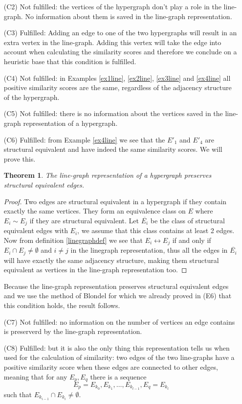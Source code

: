 \documentclass[a4paper,11pt]{report}
\newtheorem{theorem}{Theorem}[section]
\begin{document}
\begin{itemize}
 
   \item[(C2)] Not fulfilled: the vertices of the hypergraph don't play a role 
   in the line-graph. No information about them is saved in the line-graph 
   representation.
  \item[(C3)] Fulfilled: Adding an edge to one of the two hypergraphs will 
  result in an extra vertex in the line-graph. Adding this vertex will take the 
  edge into account when calculating the similarity scores and therefore we 
  conclude on a heuristic base that this condition is fulfilled.
  \item[(C4)] Not fulfilled: in Examples \ref{ex1line}, \ref{ex2line}, \ref{ex3line}  
  and \ref{ex4line}
  all positive similarity scores are the same, regardless of the adjacency 
  structure of the hypergraph.
  \item[(C5)] Not fulfilled: there is no information about the vertices saved in 
  the line-graph representation of a hypergraph.
  \item[(C6)] Fulfilled: from Example \ref{ex4line} we see that the $E'_1$ and 
 $E'_4$ are structural equivalent and have indeed the same similarity scores. We will 
 prove this.
 
 \begin{theorem}
   The line-graph representation of a hypergraph preserves structural equivalent 
   edges.
 \end{theorem}
 \begin{proof}
   Two edges are structural equivalent in a hypergraph if they contain exactly the same 
   vertices. They form an equivalence class on $E$ where $E_i \sim E_j$ if they 
   are structural equivalent. Let $\overline{E_i}$ be the class of structural equivalent 
   edges with $E_i$, we assume that this class contains at least 2 edges. Now from definition \ref{linegraphdef} we see that
   $E_i \leftrightarrow E_j$ if and only if $E_i \cap E_j \not = \emptyset$ and $i \not = j$ 
   in the linegraph representation, thus all the edges in $\overline{E_i}$ will 
   have exactly the same adjacency structure, making them structural equivalent as vertices in the 
   line-graph representation too.
 \end{proof}
 Because the line-graph representation preserves structural equivalent edges and we use the method of Blondel for which we already proved
 in (E6) that this condition holds, the result follows.
     \item[(C7)] Not fulfilled: no information on the number of vertices an edge 
contains is preserverd by the line-graph representation.
  \item[(C8)] Fulfilled: but it is also the only thing this representation tells us 
  when used for the calculation of similarity: two edges of the two line-graphs
  have a positive similarity score when these edges are connected to other edges, meaning that for any $E_p, E_q$ there is a sequence 
  $$E_p = E_{k_0}, E_{k_1}, \ldots, E_{k_{l-1}}, E_q = E_{k_l}$$
  such that $E_{k_{i-1}} \cap E_{k_i} \not = \emptyset$. 
  

\end{itemize}
\end{document}
